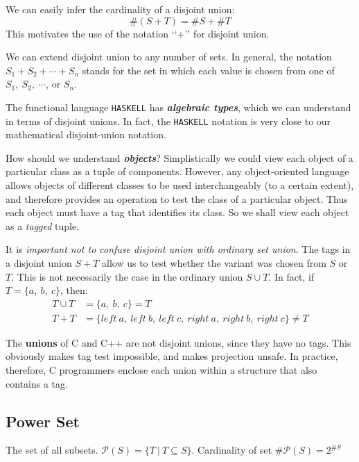 \documentclass{article}
\begin{document}
We can easily infer the cardinality of a disjoint union:
\begin{equation}
    \text{\#}(S + T) = \text{\#}S + \text{\#}T
\end{equation}
This motivates the use of the notation ‘‘$+$’’ for disjoint union.

We can extend disjoint union to any number of sets. In general, the notation $S_1 + S_2 + \cdots + S_n$ stands for the set in which each value is chosen from one of $S_1,\ S_2,\ \cdots$, or $S_n$.

The functional language \texttt{HASKELL} has \textbf{\textit{algebraic types}}, which we can understand in terms of disjoint unions. In fact, the \texttt{HASKELL} notation is very close to our mathematical disjoint-union notation.\newline


How should we understand \textbf{\textit{objects}}? Simplistically we could view each object of a particular class as a tuple of components. However, any object-oriented language allows objects of different classes to be used interchangeably (to a certain extent), and therefore provides an operation to test the class of a particular object. Thus each object must have a tag that identifies its class. So we shall view each object as a \textit{tagged} tuple.


It is \textit{important not to confuse disjoint union with ordinary set union}. The tags in a disjoint union $S + T$ allow us to test whether the variant was chosen from $S$ or $T$. This is not necessarily the case in the ordinary union $S \cup T$. In fact, if $T = \{a,\ b,\ c\}$, then:
\begin{align}
    T \cup T &= \{a,\ b,\ c\} = T\\
    T + T &= \{left\ a,\ left\ b,\ left\ c,\ right\ a,\ right\ b,\ right\ c\} \neq T
\end{align}

The \textbf{unions} of C and C++ are not disjoint unions, since they have no tags. This obviously makes tag test impossible, and makes projection unsafe. In practice, therefore, C programmers enclose each union within a structure that also contains a tag.

\subsection{Power Set}

The set of all subsets. $\mathcal{P}(S) = \{T\ |\ T \subseteq S\}$. Cardinality of set \#$\mathcal{P}(S) = 2^{\text{\#}S}$ \newpage
\end{document}
